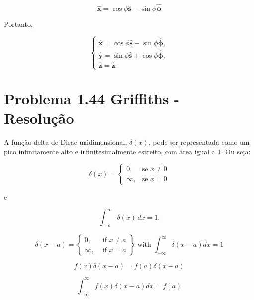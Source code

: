 \documentclass[a4paper,12pt]{article}
\begin{document}
\begin{equation}
    \hat{\mathbf{x}} = \cos\phi \hat{\mathbf{s}} - \sin\phi \hat{\bm{\phi}}
\end{equation}

Portanto,

\begin{equation}
    \begin{cases}
        \hat{\mathbf{x}} = \cos\phi \hat{\mathbf{s}} - \sin\phi \hat{\bm{\phi}}, \\
        \hat{\mathbf{y}} = \sin\phi \hat{\mathbf{s}} + \cos\phi \hat{\bm{\phi}}, \\
        \hat{\bm{z}} = \hat{\bm{z}}.
    \end{cases}
    \end{equation}

\section*{Problema 1.44 Griffiths - Resolu\c{c}\~ao}

A função delta de Dirac unidimensional, \(\delta(x)\), pode ser representada como um pico infinitamente alto e 
infinitesimalmente estreito, com área igual a 1. Ou seja:

\begin{equation}
\delta(x) =
\begin{cases}
    0, & \text{se } x \neq 0 \\
    \infty, & \text{se } x = 0
\end{cases}
\end{equation}

e

\begin{equation}
\int_{-\infty}^{\infty} \delta(x) \, dx = 1.
\end{equation}

\begin{equation}
\delta(x-a)=\left\{\begin{array}{ll}
0, & \text { if } x \neq a \\
\infty, & \text { if } x=a
\end{array}\right\} \text { with } \int_{-\infty}^{\infty} \delta(x-a) d x=1
\end{equation}

\begin{equation}
f(x) \delta(x-a)=f(a) \delta(x-a)
\end{equation}

\begin{equation}
\int_{-\infty}^{\infty} f(x) \delta(x-a) d x=f(a)
\end{equation}
\end{document}
